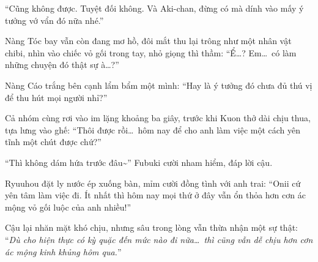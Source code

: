 \documentclass[../main.tex]{subfiles}
\begin{document}
``Cũng không được. Tuyệt đối không. Và Aki-chan, đừng có mà dính vào mấy ý tưởng vớ vẩn đó nữa nhé.''

Nàng Tóc bay vẫn còn đang mơ hồ, đôi mắt thu lại trông như một nhân vật chibi, nhìn vào chiếc vỏ gối trong tay, nhỏ giọng thì thầm: ``Ể\dots? Em\dots\ có làm những chuyện đó thật sự à\dots?''

Nàng Cáo trắng bên cạnh lẩm bẩm một mình: ``Hay là ý tưởng đó chưa đủ thú vị để thu hút mọi người nhỉ?''

Cả nhóm cùng rơi vào im lặng khoảng ba giây, trước khi Kuon thở dài chịu thua, tựa lưng vào ghế: ``Thôi được rồi\dots\ hôm nay để cho anh làm việc một cách yên tĩnh một chút được chứ?''

``Thì không dám hứa trước đâu\~{}'' Fubuki cười nham hiểm, đáp lời cậu.

Ryuuhou đặt ly nước ép xuống bàn, mỉm cười đồng tình với anh trai: ``Onii cứ yên tâm làm việc đi. Ít nhất thì hôm nay mọi thứ ở đây vẫn ổn thỏa hơn cơn ác mộng vỏ gối luộc của anh nhiều!''

Cậu lại nhăn mặt khó chịu, nhưng sâu trong lòng vẫn thừa nhận một sự thật: ``\textit{Dù cho hiện thực có kỳ quặc đến mức nào đi nữa\dots\ thì cũng vẫn dễ chịu hơn cơn ác mộng kinh khủng hôm qua.}''
\end{document}
